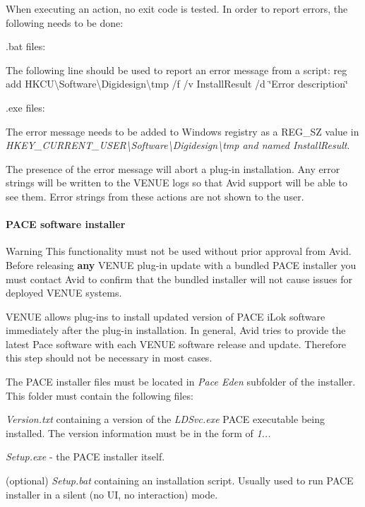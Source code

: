  When executing an action, no exit code is tested. In order to report errors, the following needs to be done\+: 
\begin{DoxyEnumerate}
\item .bat files\+:

The following line should be used to report an error message from a script\+: {\ttfamily reg add H\+K\+CU\textbackslash{}Software\textbackslash{}Digidesign\textbackslash{}tmp /f /v Install\+Result /d \char`\"{}\+Error description\char`\"{}}  
\item .exe files\+:

The error message needs to be added to Windows registry as a R\+E\+G\+\_\+\+SZ value in {\itshape H\+K\+E\+Y\+\_\+\+C\+U\+R\+R\+E\+N\+T\+\_\+\+U\+S\+ER\textbackslash{}Software\textbackslash{}Digidesign\textbackslash{}tmp and named Install\+Result}.  
\end{DoxyEnumerate}

 The presence of the error message will abort a plug-\/in installation. Any error strings will be written to the V\+E\+N\+UE logs so that Avid support will be able to see them. Error strings from these actions are not shown to the user.

\hypertarget{a00849_subsubsection__aax_venue_guide__installer__optional_files__pace}{}\paragraph{P\+A\+C\+E software installer}\label{a00849_subsubsection__aax_venue_guide__installer__optional_files__pace}
 \begin{DoxyWarning}{Warning}
This functionality must not be used without prior approval from Avid. Before releasing {\bfseries{any}} V\+E\+N\+UE plug-\/in update with a bundled P\+A\+CE installer you must contact Avid to confirm that the bundled installer will not cause issues for deployed V\+E\+N\+UE systems.
\end{DoxyWarning}
V\+E\+N\+UE allows plug-\/ins to install updated version of P\+A\+CE i\+Lok software immediately after the plug-\/in installation. In general, Avid tries to provide the latest Pace software with each V\+E\+N\+UE software release and update. Therefore this step should not be necessary in most cases.

 The P\+A\+CE installer files must be located in {\itshape Pace Eden} subfolder of the installer. This folder must contain the following files\+: 
\begin{DoxyItemize}
\item {\itshape Version.\+txt} containing a version of the {\itshape L\+D\+Svc.\+exe} P\+A\+CE executable being installed. The version information must be in the form of {\itshape 1...}  
\item {\itshape Setup.\+exe} -\/ the P\+A\+CE installer itself.  
\item (optional) {\itshape Setup.\+bat} containing an installation script. Usually used to run P\+A\+CE installer in a silent (no UI, no interaction) mode.  
\end{DoxyItemize}

